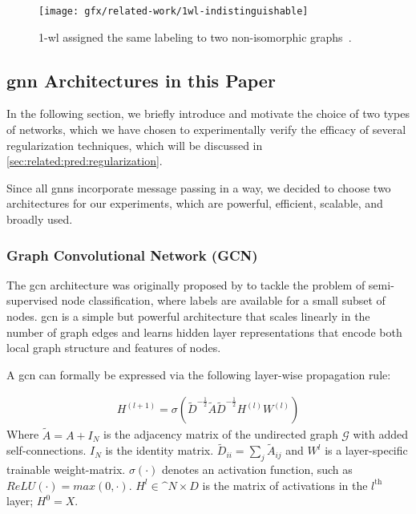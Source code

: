\begin{figure}[H]
    \centering
    \texttt{[image: gfx/related-work/1wl-indistinguishable]}
    \caption{1-\ac{wl} assigned the same labeling to two non-isomorphic graphs~\cite{Liu2022}.}\label{fig:related:1-wl-indistinguishable}
\end{figure}

\subsection{\acs*{gnn} Architectures in this Paper}
\label{sec:related:architectures}
In the following section, we briefly introduce and motivate the choice of two types of networks, which we have chosen to experimentally verify the efficacy of several regularization techniques, which will be discussed in \cref{sec:related:pred:regularization}.

Since all \acp{gnn} incorporate message passing in a way, we decided to choose two architectures for our experiments, which are powerful, efficient, scalable, and broadly used.
\subsubsection{Graph Convolutional Network (GCN)}
\label{sec:related:architectures:gcn}
The \acf{gcn} architecture was originally proposed by \citet{Kipf2017} to tackle the problem of semi-supervised node classification, where labels are available for a small subset of nodes.
\Ac{gcn} is a simple but powerful architecture that scales linearly in the number of graph edges and learns hidden layer representations that encode both local graph structure and features of nodes.

A \ac{gcn} can formally be expressed via the following layer-wise propagation rule:

\begin{align*}
    H^{(l+1)} = \sigma (\tilde{D}^{-\frac{1}{2}}\tilde{A}\tilde{D}^{-\frac{1}{2}} H^{(l)}W^{(l)})
\end{align*}
Where $\tilde{A} = A + I_{N}$ is the adjacency matrix of the undirected graph $\mathcal{G}$
with added self-connections. $I_{N}$ is the identity matrix. $\tilde{D}_{ii} = \sum_{j}\tilde{A}_{ij}$ and $W^{l}$ is a layer-specific trainable weight-matrix. $\sigma(\cdot)$ denotes an activation function, such as $ReLU(\cdot) = max(0, \cdot)$. $ H^{l}\in  \mathbb^{N \times D}$ is the matrix of activations in the
$l^{\mathrm{th}}$ layer; $H^{0}= X$.

